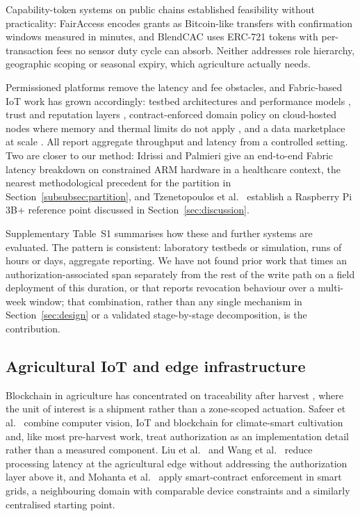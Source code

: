 \documentclass[a4paper,fleqn]{cas-sc}
\begin{document}
Capability-token systems on public chains established feasibility without
practicality: FairAccess \cite{ouaddah2016fairaccess} encodes grants as
Bitcoin-like transfers with confirmation windows measured in minutes, and
BlendCAC \cite{xu2018blendcac} uses ERC-721 tokens with per-transaction fees
no sensor duty cycle can absorb. Neither addresses role hierarchy,
geographic scoping or seasonal expiry, which agriculture actually needs.

Permissioned platforms remove the latency and fee obstacles, and Fabric-based
IoT work has grown accordingly: testbed architectures and performance models
\cite{shih2022iiot,pajooh2022fabric_iot,kepark2023fabric_model}, trust and
reputation layers \cite{putra2021trust}, contract-enforced domain policy on
cloud-hosted nodes where memory and thermal limits do not apply
\cite{usman2024blockchain}, and a data marketplace at scale
\cite{gonzalez2023marketplace}. All report aggregate throughput and latency
from a controlled setting. Two are closer to our method: Idrissi and
Palmieri \cite{idrissi2024blockchain_jsupercomput} give an end-to-end Fabric
latency breakdown on constrained ARM hardware in a healthcare context, the
nearest methodological precedent for the partition in
Section~\ref{subsubsec:partition}, and Tzenetopoulos et
al.\ \cite{tzenetopoulos2022hlfkubed} establish a Raspberry Pi 3B+ reference
point discussed in Section~\ref{sec:discussion}.

Supplementary Table~S1 summarises how these and further systems
\cite{zaidi2023fabrication,bandara2021modeling} are evaluated. The pattern
is consistent: laboratory testbeds or simulation, runs of hours or days,
aggregate reporting. We have not found prior work that times an
authorization-associated span separately from the rest of the write path on
a field deployment of this duration, or that reports revocation behaviour
over a multi-week window; that combination, rather than any single
mechanism in Section~\ref{sec:design} or a validated stage-by-stage
decomposition, is the contribution.

\subsection{Agricultural IoT and edge infrastructure}
\label{subsec:rw_agri}

Blockchain in agriculture has concentrated on traceability after harvest
\cite{tian2017traceability,lin2018blockchain,bandara2021modeling}, where the
unit of interest is a shipment rather than a zone-scoped actuation. Safeer et
al.\ \cite{safeer2025agrifarming} combine computer vision, IoT and blockchain
for climate-smart cultivation and, like most pre-harvest work, treat
authorization as an implementation detail rather than a measured component.
Liu et al.\ \cite{liu2019edge} and Wang et al.\ \cite{wang2021edge} reduce
processing latency at the agricultural edge without addressing the
authorization layer above it, and Mohanta et al.\ \cite{mohanta2025smartgrid}
apply smart-contract enforcement in smart grids, a neighbouring domain with
comparable device constraints and a similarly centralised starting point.
\end{document}
